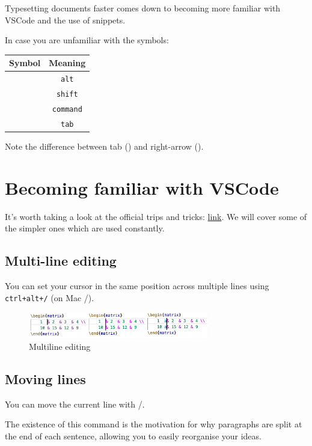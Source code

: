 Typesetting documents faster comes down to becoming more familiar with VSCode and the use of snippets.

In case you are unfamiliar with the symbols:
\begin{table}[h] \centering
\begin{tabular}{cc}
    Symbol & Meaning \\ \hline
    \keys{\Alt} &\texttt{alt}\\ 
    \keys{\shift} & \texttt{shift}\\
    \keys{\cmd} & \texttt{command}\\
    \keys{\tab} & \texttt{tab}
\end{tabular}
\end{table}

Note the difference between tab (\keys{\tab}) and right-arrow (\keys{\arrowkeyright}).
\section{Becoming familiar with VSCode}
It's worth taking a look at the official trips and tricks: \href{https://code.visualstudio.com/docs/getstarted/tips-and-tricks}{link}.
We will cover some of the simpler ones which are used constantly.
\subsection{Multi-line editing}
You can set your cursor in the same position across multiple lines using
\texttt{ctrl+alt+\keys{\arrowkeyup}/\keys{\arrowkeydown}} (on Mac \keys{\cmd + \Alt + \arrowkeyup}/\keys{\arrowkeydown}).

\begin{figure}[h]
\centering
    \includegraphics[width=0.7\textwidth]{figures/multiline.png}
\caption{Multiline editing}
\end{figure}

\subsection{Moving lines}
You can move the current line with \keys{\Alt + \arrowkeyup}/\keys{\arrowkeydown}.

The existence of this command is the motivation for why paragraphs are split at the end of each sentence, allowing you to easily reorganise your ideas.

